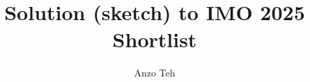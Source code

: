 \documentclass[11pt,a4paper]{article}
\begin{document}
		\newcommand{\la}{\leftarrow}
	\newcommand{\lra}{\leftrightarrow}
	\newcommand{\bbN}{{\mathbb N}}
	\newcommand{\bbZ}{{\mathbb Z}}
	\newcommand{\bbQ}{{\mathbb Q}}
	\newcommand{\bbR}{{\mathbb R}}
	\newcommand{\bbC}{{\mathbb C}}
	\newcommand{\bbH}{{\mathbb H}}
	\newcommand{\dfeq}{\stackrel{\mathrm{def}}{=}}
	\newcommand{\ra}{\rightarrow}
	\newcommand{\Span}{\mathrm{span}}
	\newcommand{\scrP}{\mathscr{P}}
	\newcommand{\rank}{\mathrm{rank}}
	\newcommand{\nullity}{\mathrm{nullity}}
	\newcommand{\Col}{\mathrm{Col}}
	\newcommand{\Row}{\mathrm{Row}}
	\newcommand{\tr}{\mathrm{tr}}
	\newcommand{\ol}{\overline}
	\newcommand{\norm}[1]{||#1||}
	\newcommand{\doubleline}[1]{\underline{\underline{#1}}}
	\newcommand{\elemop}[1]{\stackrel{#1}{\longrightarrow}}
	\newcommand{\Ind}{\mathrm{Ind}}
	\newcommand{\Res}{\mathrm{Res}}
	\newcommand{\End}{\mathrm{End}}
	\newcommand{\cl}{\mathrm{cl}}
	\newcommand{\code}[1]{\texttt{#1}}
	\newcommand\tab[1][0.5cm]{\hspace*{#1}}
	\newcommand{\<}{\langle}
	\renewcommand{\>}{\rangle}
	\newcommand{\qubits}[1]{|{#1}\rangle}
	\newcommand{\powset}{\mathcal{P}}
	\newcommand{\dsum}{\displaystyle\sum}
	\newcommand{\dprod}{\displaystyle\prod}
	
	\newtheorem{lemma}{Lemma}
	
	\title{Solution (sketch) to IMO 2025 Shortlist}
	\date{}
	\author{Anzo Teh}
	\maketitle
	
\end{document}
